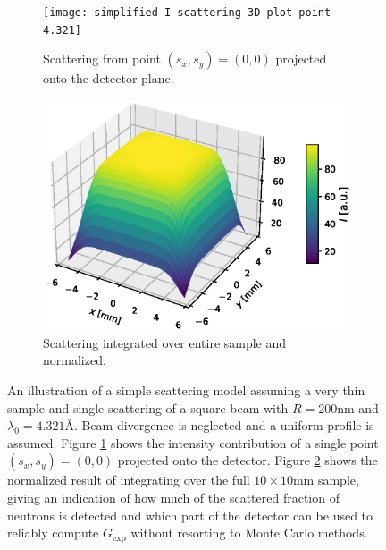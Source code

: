 \documentclass{article}
\begin{document}
\begin{figure}[htbp]
	\centering
	\begin{subfigure}[b]{0.49\textwidth}
		\centering
		\texttt{[image: simplified-I-scattering-3D-plot-point-4.321]}
		\caption{Scattering from point $(s_x,s_y) = (0,0)$ projected onto the detector plane.}
		\label{fig:simplified-scattering-3D:a}
	\end{subfigure}
	\hfill
	\begin{subfigure}[b]{0.49\textwidth}
		\centering
		\includegraphics[width=\textwidth]{simplified-I-scattering-3D-plot-4.321}
		\caption{Scattering integrated over entire sample and normalized.}
		\label{fig:simplified-scattering-3D:b}
	\end{subfigure}
	\caption{An illustration of a simple scattering model assuming a very thin sample and single scattering of a square beam with $R=200\unit{\nano\meter}$ and $\lambda_0 = 4.321$Å. Beam divergence is neglected and a uniform profile is assumed. Figure \ref{fig:simplified-scattering-3D:a} shows the intensity contribution of a single point $(s_x,s_y) = (0,0)$ projected onto the detector. Figure \ref{fig:simplified-scattering-3D:b} shows the normalized result of integrating over the full $10\times10\unit{\milli\meter}$ sample, giving an indication of how much of the scattered fraction of neutrons is detected and which part of the detector can be used to reliably compute $G_\text{exp}$ without resorting to Monte Carlo methods.}
	\label{fig:simplified-scattering-3D}
\end{figure}
\end{document}
